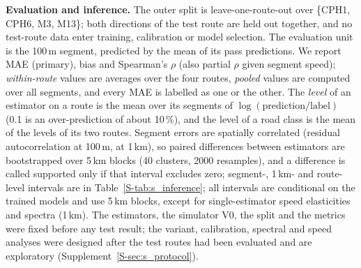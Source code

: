 \textbf{Evaluation and inference.}
The outer split is leave-one-route-out over \{CPH1, CPH6, M3, M13\}; both directions of the test route are held out together, and no test-route data enter training, calibration or model selection.
The evaluation unit is the 100\,m segment, predicted by the mean of its pass predictions.
We report MAE (primary), bias and Spearman's $\rho$ (also partial $\rho$ given segment speed); \emph{within-route} values are averages over the four routes, \emph{pooled} values are computed over all \liraSegments{} segments, and every MAE is labelled as one or the other.
The \emph{level} of an estimator on a route is the mean over its segments of $\log(\text{prediction}/\text{label})$ (0.1 is an over-prediction of about 10\,\%), and the level of a road class is the mean of the levels of its two routes.
Segment errors are spatially correlated (residual autocorrelation \acfGbmHundred{} at 100\,m, \acfGbmKm{} at 1\,km), so paired differences between estimators are bootstrapped over 5\,km blocks (40 clusters, 2000 resamples), and a difference is called supported only if that interval excludes zero; segment-, 1\,km- and route-level intervals are in Table~\ref{S-tab:s_inference}; all intervals are conditional on the trained models and use 5\,km blocks, except for single-estimator speed elasticities and spectra (1\,km).
The estimators, the simulator V0, the split and the metrics were fixed before any test result; the variant, calibration, spectral and speed analyses were designed after the test routes had been evaluated and are exploratory (Supplement~\ref{S-sec:s_protocol}).

